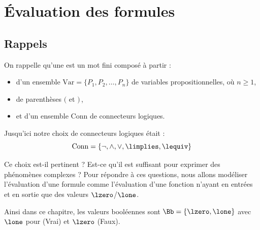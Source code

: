 \documentclass[11pt,class=report,crop=false]{standalone}
\begin{document}









\section{Évaluation des formules}

\subsection{Rappels}

On rappelle qu'une  est un mot fini composé à partir :
\begin{itemize}
	\item d'un ensemble $\text{Var} = \{P_1, P_2,\ldots, P_n\}$ de variables propositionnelles, où $n\ge1$,
	
	\item de parenthèses $($ et $)$\,,
		
	\item et d'un ensemble $\text{Conn}$ de connecteurs logiques.
\end{itemize}

Jusqu'ici notre choix de connecteurs logiques était :
\[
\text{Conn} = \{ \lnot, \land, \lor, \limplies, \lequiv \}
\]

Ce choix est-il pertinent ? Est-ce qu'il est suffisant pour exprimer des phénomènes complexes ? Pour répondre  à ces questions, nous allons modéliser l'évaluation d'une formule comme l'évaluation d'une fonction n'ayant en entrées et en sortie que des valeurs $\lzero$/$\lone$.

Ainsi dans ce chapitre, les valeurs booléennes sont $\Bb = \{ \lzero, \lone \}$ avec $\lone$ pour \ltrue{} (Vrai) et $\lzero${} (Faux).
\end{document}
